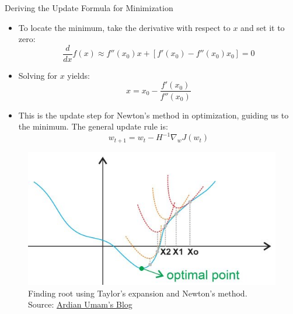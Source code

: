 \documentclass[serif, aspectratio=169]{beamer}
\begin{document}
\begin{frame}{Deriving the Update Formula for Minimization}
\begin{minipage}{0.7\linewidth}
    \begin{itemize}
        \item To locate the minimum, take the derivative with respect to \( x \) and set it to zero:
        \[
        \frac{d}{dx} f(x) \approx f''(x_0)x + [f'(x_0) - f''(x_0)x_0] = 0
        \]
        \item Solving for \( x \) yields:
        \[
        x = x_0 - \frac{f'(x_0)}{f''(x_0)}
        \]
        \item This is the update step for Newton’s method in optimization, guiding us to the minimum. The general update rule is:
        \[
        w_{t+1} = w_t - H^{-1} \nabla_w J(w_t)
        \]
    \end{itemize}
\end{minipage}%
\begin{minipage}{0.3\linewidth}
    \begin{figure}
        \centering
        \includegraphics[width=1.2\linewidth]{pic/newton_ardianumam.jpg}
        \caption{\footnotesize Finding root using Taylor's expansion and Newton's method. Source: \href{https://ardianumam.wordpress.com}{Ardian Umam's Blog}}
    \end{figure}
\end{minipage}
\end{frame}
\end{document}
